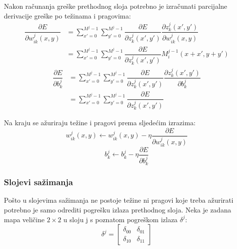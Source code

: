 \documentclass[times, utf8, zavrsni, numeric]{fer}
\begin{document}
Nakon računanja greške prethodnog sloja potrebno je izračunati parcijalne derivacije greške po težinama i pragovima:
\begin{equation}\label{eq:conv-sloj-derw}
\begin{split}
\dfrac{\partial E}{\partial w^j_{ik}(x, y)} &= \sum_{x'=0}^{M^j-1} \sum_{y'=0}^{M^j-1} \dfrac{\partial E}{\partial z^j_k (x', y')} \dfrac{\partial z^j_k (x', y')}{\partial w^j_{ik}(x, y)} \\
&= \sum_{x'=0}^{M^j-1} \sum_{y'=0}^{M^j-1} \dfrac{\partial E}{\partial z^j_k (x', y')} M^{j-1}_i (x+x', y+y')
\end{split}
\end{equation}
\begin{equation}\label{eq:conv-sloj-derb}
\begin{split}
\dfrac{\partial E}{\partial b^j_k} &= \sum_{x'=0}^{M^j-1} \sum_{y'=0}^{M^j-1} \dfrac{\partial E}{\partial z^j_k (x', y')} \dfrac{\partial z^j_k (x', y')}{\partial b^j_k} \\
&= \sum_{x'=0}^{M^j-1} \sum_{y'=0}^{M^j-1} \dfrac{\partial E}{\partial z^j_k (x', y')}
\end{split}
\end{equation}

Na kraju se ažuriraju težine i pragovi prema sljedećim izrazima:
\begin{equation}\label{eq:conv-azuriraj-w}
w^j_{ik}(x, y) \leftarrow w^j_{ik}(x, y) - \eta\dfrac{\partial E}{\partial w^j_{ik}(x, y)}
\end{equation}
\begin{equation}\label{eq:conv-azuriraj-b}
b^j_k \leftarrow b^j_k - \eta\dfrac{\partial E}{\partial b^j_k}
\end{equation}

\subsubsection{Slojevi sažimanja}
Pošto u slojevima sažimanja ne postoje težine ni pragovi koje treba ažurirati potrebno je samo odrediti pogrešku izlaza prethodnog sloja. Neka je zadana mapa veličine $2 \times 2$ u sloju j s poznatom pogreškom izlaza $\delta^j$:
\begin{equation}
\delta^j = \left[
\begin{matrix}
\delta_{00} & \delta_{01} \\
\delta_{10} & \delta_{11}
\end{matrix}
\right]
\end{equation}
\end{document}
